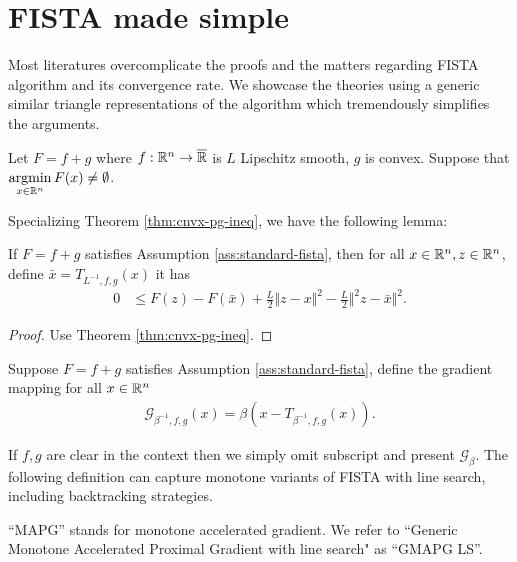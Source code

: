 \documentclass[12pt]{report}
\begin{document}
    \section{FISTA made simple}
        Most literatures overcomplicate the proofs and the matters regarding FISTA algorithm and its convergence rate. 
        We showcase the theories using a generic similar triangle representations of the algorithm which tremendously simplifies the arguments. 
        \begin{assumption}\label{ass:standard-fista}
            Let $F = f + g$ where $f:\mathbb R^n\rightarrow \overline {\mathbb R}$ is $L$ Lipschitz smooth, $g$ is convex. 
            Suppose that $\mathop{\rm argmin}\limits_{x \in \mathbb R^n} F(x)\neq \emptyset$. 
        \end{assumption}
        Specializing Theorem \ref{thm:cnvx-pg-ineq}, we have the following lemma: 
        \begin{lemma}
            If $F = f + g$ satisfies Assumption \ref{ass:standard-fista}, then for all $x \in \mathbb R^n, z \in \mathbb R^n$, define $\bar x = T_{L^{-1}, f, g}(x)$ it has 
            \begin{align*}
                0 &\le F(z) - F(\bar x) + \frac{L}{2}\Vert z - x\Vert^2 - \frac{L}{2}\Vert^2 z - \bar x\Vert^2. 
            \end{align*}
        \end{lemma}
        \begin{proof}
            Use Theorem \ref{thm:cnvx-pg-ineq}. 
        \end{proof}
        \begin{definition}
            Suppose $F = f + g$ satisfies Assumption \ref{ass:standard-fista}, define the gradient mapping for all $x \in \mathbb R^n$
            \begin{align*}
                \mathcal G_{\beta^{-1}, f, g}(x) = \beta(x - T_{\beta^{-1}, f, g}(x)). 
            \end{align*}
        \end{definition}
        If $f, g$ are clear in the context then we simply omit subscript and present $\mathcal G_\beta$. 
        The following definition can capture monotone variants of FISTA with line search, including backtracking strategies. 
        \par
        ``MAPG'' stands for monotone accelerated gradient. 
        We refer to ``Generic Monotone Accelerated Proximal Gradient with line search" as ``GMAPG LS''. 
\end{document}
